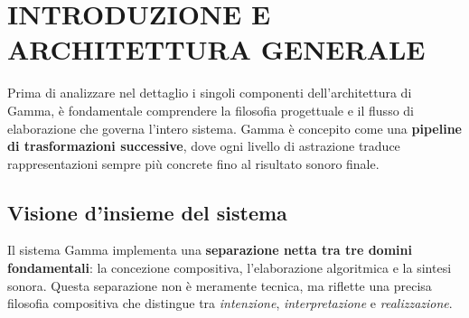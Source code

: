 
\section{INTRODUZIONE E ARCHITETTURA GENERALE}

Prima di analizzare nel dettaglio i singoli componenti dell'architettura di Gamma, è fondamentale comprendere la filosofia progettuale e il flusso di elaborazione che governa l'intero sistema. Gamma è concepito come una \textbf{pipeline di trasformazioni successive}, dove ogni livello di astrazione traduce rappresentazioni sempre più concrete fino al risultato sonoro finale.

\subsection{Visione d'insieme del sistema}

Il sistema Gamma implementa una \textbf{separazione netta tra tre domini fondamentali}: la concezione compositiva, l'elaborazione algoritmica e la sintesi sonora. Questa separazione non è meramente tecnica, ma riflette una precisa filosofia compositiva che distingue tra \emph{intenzione}, \emph{interpretazione} e \emph{realizzazione}.

